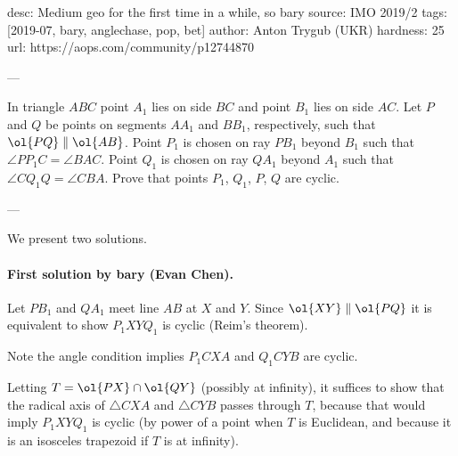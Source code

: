 desc: Medium geo for the first time in a while, so bary
source: IMO 2019/2
tags: [2019-07, bary, anglechase, pop, bet]
author: Anton Trygub (UKR)
hardness: 25
url: https://aops.com/community/p12744870

---

In triangle $ABC$ point $A_1$ lies on side $BC$
and point $B_1$ lies on side $AC$.
Let $P$ and $Q$ be points on segments $AA_1$ and $BB_1$,
respectively, such that $\ol{PQ} \parallel \ol{AB}$.
Point $P_1$ is chosen on ray $PB_1$ beyond $B_1$
such that $\angle PP_1C = \angle BAC$.
Point $Q_1$ is chosen on ray $QA_1$ beyond $A_1$
such that $\angle CQ_1Q = \angle CBA$.
Prove that points $P_1$, $Q_1$, $P$, $Q$ are cyclic.

---

We present two solutions.

\paragraph{First solution by bary (Evan Chen).}
Let $PB_1$ and $QA_1$ meet line $AB$ at $X$ and $Y$.
Since $\ol{XY} \parallel \ol{PQ}$ it is equivalent
to show $P_1XYQ_1$ is cyclic (Reim's theorem).

Note the angle condition implies $P_1CXA$ and $Q_1CYB$ are cyclic.

Letting $T = \ol{PX} \cap \ol{QY}$ (possibly at infinity),
it suffices to show that the
radical axis of $\triangle CXA$ and $\triangle CYB$ passes through $T$,
because that would imply $P_1XYQ_1$ is cyclic
(by power of a point when $T$ is Euclidean,
and because it is an isosceles trapezoid if $T$ is at infinity).

